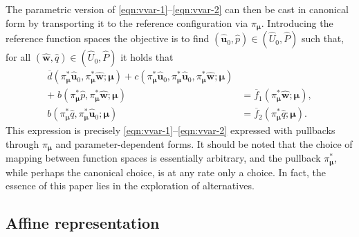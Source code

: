 \documentclass[onecolumn, twoside, a4paper, 11pt]{article}
\begin{document}
The parametric version of \eqref{eqn:vvar-1}--\eqref{eqn:vvar-2} can then be cast in
canonical form by transporting it to the reference configuration via $\pi_{\bm\mu}$.
Introducing the reference function spaces
the objective is to find $(\hat{\bm u}_0, \hat{p}) \in (\hat{U}_0, \hat{P})$ such
that, for all $(\hat{\bm w}, \hat{q}) \in (\hat{U}_0, \hat{P})$ it holds
that
\begin{align}
  \nonumber \overline{d}(
    \pi_{\bm \mu}^* \hat{\bm u}_0,
    \pi_{\bm \mu}^* \hat{\bm w};
    \bm \mu
  ) + c(
    \pi_{\bm \mu}^* \hat{\bm u}_0,
    \pi_{\bm \mu}^* \hat{\bm u}_0,
    \pi_{\bm \mu}^* \hat{\bm w};
    \bm \mu
  ) \\
  + \; b(
    \pi_{\bm \mu}^* \hat{p},
    \pi_{\bm \mu}^* \hat{\bm w};
    \bm \mu
  ) &= \overline{f}_1(
    \pi_{\bm \mu}^* \hat{\bm w};
    \bm \mu
  )
  \label{eqn:war-1}, \\
  b(
    \pi_{\bm \mu}^* \hat{q},
    \pi_{\bm \mu}^* \hat{\bm u}_0;
    \bm \mu
  ) &= \overline{f}_2(
    \pi_{\bm \mu}^* \hat{q};
    \bm \mu
  ). \label{eqn:war-2}
\end{align}
This expression is precisely \eqref{eqn:vvar-1}--\eqref{eqn:vvar-2} expressed
with pullbacks through $\pi_{\bm \mu}$ and parameter-dependent forms. It should
be noted that the choice of mapping between function spaces is essentially
arbitrary, and the pullback $\pi_{\bm \mu}^*$, while perhaps the canonical
choice, is at any rate only a choice. In fact, the essence of this paper lies in
the exploration of alternatives.

\subsection{Affine representation}
\label{sec:affrep}
\end{document}
